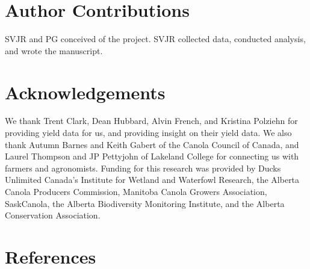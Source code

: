 \documentclass[]{elsarticle} %
\begin{document}
\hypertarget{author-contributions}{%
\section{Author Contributions}\label{author-contributions}}

SVJR and PG conceived of the project.
SVJR collected data, conducted analysis, and wrote the manuscript.

\hypertarget{acknowledgements}{%
\section{Acknowledgements}\label{acknowledgements}}

We thank Trent Clark, Dean Hubbard, Alvin French, and Kristina Polziehn for providing yield data for us, and providing insight on their yield data.
We also thank Autumn Barnes and Keith Gabert of the Canola Council of Canada, and Laurel Thompson and JP Pettyjohn of Lakeland College for connecting us with farmers and agronomists.
Funding for this research was provided by Ducks Unlimited Canada's Institute for Wetland and Waterfowl Research, the Alberta Canola Producers Commission, Manitoba Canola Growers Association, SaskCanola, the Alberta Biodiversity Monitoring Institute, and the Alberta Conservation Association.

\hypertarget{references}{%
\section*{References}\label{references}}
\end{document}
